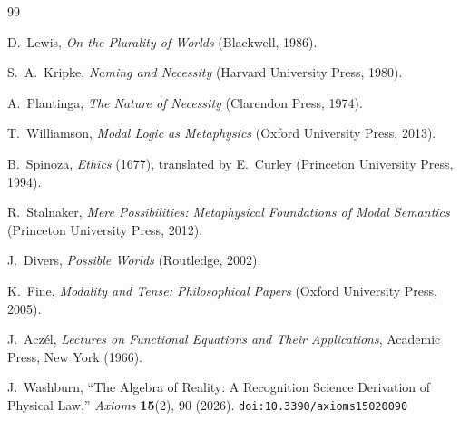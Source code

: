 \documentclass[12pt,a4paper]{article}
\theoremstyle{definition}
\theoremstyle{remark}
\begin{document}
\begin{thebibliography}{99}

D.~Lewis, \emph{On the Plurality of Worlds} (Blackwell, 1986).

S.~A.~Kripke, \emph{Naming and Necessity} (Harvard University Press,
1980).

A.~Plantinga, \emph{The Nature of Necessity} (Clarendon Press, 1974).

T.~Williamson, \emph{Modal Logic as Metaphysics} (Oxford University
Press, 2013).

B.~Spinoza, \emph{Ethics} (1677), translated by E.~Curley (Princeton
University Press, 1994).

R.~Stalnaker, \emph{Mere Possibilities: Metaphysical Foundations of
Modal Semantics} (Princeton University Press, 2012).

J.~Divers, \emph{Possible Worlds} (Routledge, 2002).

K.~Fine, \emph{Modality and Tense: Philosophical Papers} (Oxford
University Press, 2005).

J.~Acz\'el, \emph{Lectures on Functional Equations and Their Applications},
Academic Press, New York (1966).

J.~Washburn, ``The Algebra of Reality: A Recognition Science Derivation
of Physical Law,'' \emph{Axioms} \textbf{15}(2), 90 (2026).
\texttt{doi:10.3390/axioms15020090}

\end{thebibliography}
\end{document}
